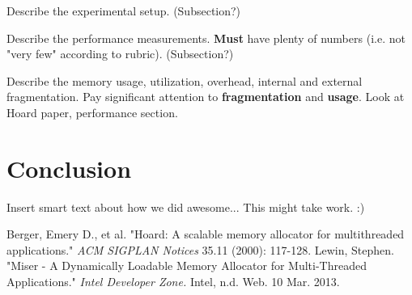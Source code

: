 \documentclass{article}
\begin{document}
Describe the experimental setup. (Subsection?)

Describe the performance measurements. \textbf{Must} have plenty of numbers 
(i.e. not "very few" according to rubric). (Subsection?)

Describe the memory usage, utilization, overhead, internal and external 
fragmentation. Pay significant attention to \textbf{fragmentation} and 
\textbf{usage}. Look at Hoard paper, performance section. 

\newpage
\section{Conclusion}
\label{sec:conclusion}

Insert smart text about how we did awesome... This might take work. :)

\newpage

\begin{thebibliography}{9}
	
		Berger, Emery D., et al.
		"Hoard: A scalable memory allocator for multithreaded applications."
		\textit{ACM SIGPLAN Notices} 35.11 
		(2000): 
		117-128.
		Lewin, Stephen.
		"Miser - A Dynamically Loadable Memory Allocator for Multi-Threaded Applications."
		\textit{Intel Developer Zone.}
		Intel, 
		n.d. Web. 10 Mar. 2013.

\end{thebibliography}
\end{document}

